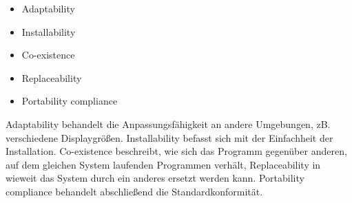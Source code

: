 \begin{itemize}
  \item \glqq Adaptability\grqq
  \item \glqq Installability\grqq
  \item \glqq Co-existence\grqq
  \item \glqq Replaceability\grqq
  \item \glqq Portability compliance\grqq
\end{itemize}

Adaptability behandelt die Anpassungsfähigkeit an andere Umgebungen, zB. verschiedene Displaygrößen. Installability befasst sich mit der Einfachheit der Installation.  Co-existence beschreibt, wie sich das Programm gegenüber anderen, auf dem gleichen System laufenden Programmen verhält,   Replaceability in wieweit das System durch ein anderes ersetzt werden kann. Portability compliance behandelt abschließend die Standardkonformität. \cite[S. 11]{ISO_SQ}